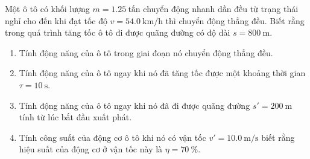 \begin{ex}
	Một ô tô có khối lượng $m=\SI{1.25}{\text{tấn}}$ chuyển động nhanh dần đều từ trạng thái nghỉ cho đến khi đạt tốc độ $v=\SI{54.0}{\kilo\meter/\hour}$ thì chuyển động thẳng đều. Biết rằng trong quá trình tăng tốc ô tô đi được quãng đường có độ dài $s=\SI{800}{\meter}$.
	\begin{enumerate}[label=\alph*)]
		\item Tính động năng của ô tô trong giai đoạn nó chuyển động thẳng đều.
		\item Tính động năng của ô tô ngay khi nó đã tăng tốc được một khoảng thời gian $\tau=\SI{10}{\second}$.
		\item Tính động năng của ô tô ngay khi nó đã đi được quãng đường $s'=\SI{200}{\meter}$ tính từ lúc bắt đầu xuất phát.
		\item Tính công suất của động cơ ô tô khi nó có vận tốc $v'=\SI{10.0}{\meter/\second}$ biết rằng hiệu suất của động cơ ở vận tốc này là $\eta=\SI{70}{\percent}$.
	\end{enumerate}
\end{ex}
